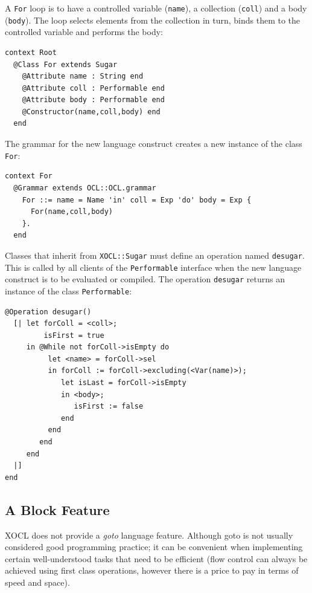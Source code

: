 \documentclass{article}
\begin{document}
A {\tt For} loop is to have a controlled variable ({\tt name}), a collection ({\tt coll}) and
a body ({\tt body}). The loop selects elements from the collection in turn, binds them to
the controlled variable and performs the body:
\begin{verbatim}
context Root
  @Class For extends Sugar
    @Attribute name : String end
    @Attribute coll : Performable end
    @Attribute body : Performable end 
    @Constructor(name,coll,body) end
  end
\end{verbatim}
The grammar for the new language construct creates a new instance of the class {\tt For}:
\begin{verbatim}
context For
  @Grammar extends OCL::OCL.grammar
    For ::= name = Name 'in' coll = Exp 'do' body = Exp { 
      For(name,coll,body) 
    }.
  end
\end{verbatim}  
Classes that inherit from {\tt XOCL::Sugar} must define an operation named {\tt desugar}.
This is called by all clients of the {\tt Performable} interface when the new language
construct is to be evaluated or compiled. The operation {\tt desugar} returns an
instance of the class {\tt Performable}:
\begin{verbatim}
@Operation desugar()
  [| let forColl = <coll>;
         isFirst = true
     in @While not forColl->isEmpty do
          let <name> = forColl->sel
          in forColl := forColl->excluding(<Var(name)>);
             let isLast = forColl->isEmpty
             in <body>;
                isFirst := false
             end
          end
        end
     end
  |]
end
\end{verbatim}

\subsection{A Block Feature}

XOCL does not provide a {\em goto} language feature. Although goto is not usually
considered good programming practice; it can be convenient when implementing certain
well-understood tasks that need to be efficient (flow control can always be achieved
using first class operations, however there is a price to pay in terms of speed and
space).
\end{document}
